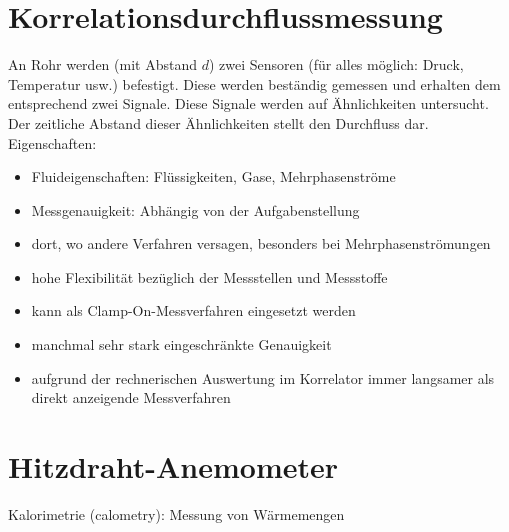 \section{Korrelationsdurchflussmessung}
An Rohr werden (mit Abstand $d$) zwei Sensoren (für alles möglich: Druck, Temperatur usw.) befestigt. Diese werden beständig gemessen und erhalten dem entsprechend zwei Signale. Diese Signale werden auf Ähnlichkeiten untersucht. Der zeitliche Abstand dieser Ähnlichkeiten stellt den Durchfluss dar.\\
Eigenschaften:
\begin{itemize}
\item Fluideigenschaften: Flüssigkeiten, Gase, Mehrphasenströme
\item Messgenauigkeit: Abhängig von der Aufgabenstellung
\end{itemize}
\begin{itemize}[label=$+$]
\item dort, wo andere Verfahren versagen, besonders bei Mehrphasenströmungen
\item hohe Flexibilität bezüglich der Messstellen und Messstoffe
\item kann als Clamp-On-Messverfahren eingesetzt werden
\end{itemize}
\begin{itemize}[label=$-$]
\item manchmal sehr stark eingeschränkte Genauigkeit
\item aufgrund der rechnerischen Auswertung im Korrelator immer langsamer als direkt anzeigende Messverfahren
\end{itemize}

\section{Hitzdraht-Anemometer}
Kalorimetrie (calometry): Messung von Wärmemengen
